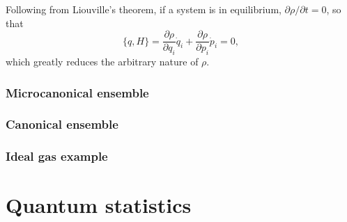 \documentclass[letter-paper]{tufte-book}
\begin{document}
Following from Liouville's theorem, if a system is in equilibrium, $\partial
\rho / \partial t = 0$, so that
\begin{equation*}
  \{q, H\} = \frac{\partial \rho}{\partial q_i} \dot{q}_i + \frac{\partial \rho}{\partial p_i} \dot{p}_i = 0,
\end{equation*}
which greatly reduces the arbitrary nature of $\rho$.


\subsection{Microcanonical ensemble}


\subsection{Canonical ensemble}


\subsection{Ideal gas example}


\chapter{Quantum statistics}










\mainmatter




%


\end{document}
